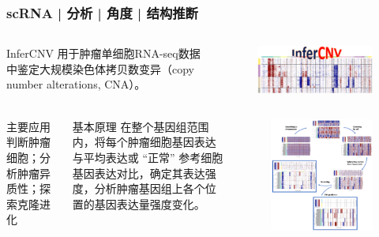 \documentclass[11pt]{ctexbeamer}
\begin{document}
\begin{frame}
	\frametitle{scRNA | 分析 | 角度 | 结构推断}
		\begin{columns}
		\begin{block}{InferCNV}
		用于肿瘤单细胞RNA-seq数据中鉴定大规模染色体拷贝数变异（copy number alterations, CNA）。
		\end{block}
		\begin{figure}
			\includegraphics[width=\textwidth]{scRNA_infercnv_logo.png}
		\end{figure}
	\end{columns}
		\begin{columns}
	\column{0.6\textwidth}
	    \begin{block}{主要应用}
判断肿瘤细胞；分析肿瘤异质性；探索克隆进化
	\end{block}
    \begin{block}{基本原理}
    	在整个基因组范围内，将每个肿瘤细胞基因表达与平均表达或 “正常” 参考细胞基因表达对比，确定其表达强度，分析肿瘤基因组上各个位置的基因表达量强度变化。
    \end{block}
\begin{figure}
	\includegraphics[width=\textwidth]{scRNA_infercnv.png}
\end{figure}
	\end{columns}
\end{frame}
\end{document}
